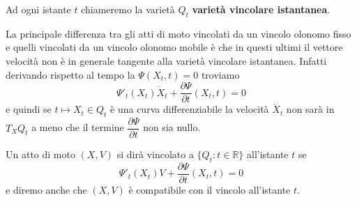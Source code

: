 \documentclass[11pt,a4paper,twoside]{book}
\theoremstyle{esss}
\theoremstyle{dotless}
\numberwithin{equation}{section} %
\begin{document}
Ad ogni istante $t$ chiameremo la varietà $Q_t$ \textbf{varietà vincolare istantanea}.

La principale differenza tra gli atti di moto vincolati da un vincolo olonomo fisso e quelli vincolati da un vincolo olonomo mobile è che in questi ultimi il vettore velocità non è in generale tangente alla varietà vincolare istantanea. Infatti derivando rispetto al tempo la $\Psi(X_t,t)=0$\footnotemark{} troviamo
\[
\Psi'_t(X_t)\dot{X}_t +\dfrac{\partial \Psi}{\partial t}(X_t,t)=0
\]
e quindi se $t\mapsto X_t\in Q_t$ è una curva differenziabile la velocità $\dot{X}_t$ non sarà in $T_X Q_t$ a meno che il termine $\dfrac{\partial \Psi}{\partial t}$ non sia nullo.


Un atto di moto $(X,V)$ si dirà vincolato a $\{ Q_t : t\in\mathbb{R}\}$ all'istante $t$ se
\begin{equation}
\Psi'_t(X_t) V + \dfrac{\partial \Psi}{\partial t} (X_t,t)=0
\end{equation}
e diremo anche che $(X,V)$ è compatibile con il vincolo all'istante $t$.
\end{document}
